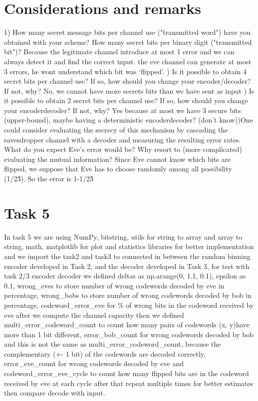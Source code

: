 \documentclass{report}
\begin{document}
\section*{Considerations and remarks}
1) How many secret message bits per channel use ("transmitted word") have you obtained with your
scheme?
How many secret bits per binary digit ("transmitted bit")?  \hfill \break \linebreak
Because the legitimate channel introduce at most 1 error and we can always detect it and find the correct input. the eve channel can generate at most 3 errors, he wont understand which bit was ‘flipped’. \hfill \break  {}) Is it possible to obtain 4 secret bits per channel use?
If so, how should you change your encoder/decoder? If not, why? \hfill \break \linebreak
No, we cannot have more secrets bits than we have sent as input \hfill \break {}) Is it possible to obtain 2 secret bits per channel use?
If so, how should you change your encoder\/decoder? If not, why?  \hfill \break \linebreak
Yes because at most we have 3 secure bits (upper-bound), maybe having a deterministic encoder\/decoder? (don't know)\hfill \break {})One could consider evaluating the secrecy of this mechanism by cascading the eavesdropper channel
with a decoder and measuring the resulting error rates. What do you expect Eve's error would be?
Why resort to (more complicated) evaluating the mutual information? \hfill \break \linebreak
Since Eve cannot know which bits are flipped, we suppose that Eve has to choose randomly among all possibility (1\//2\^3). So the error is 1-1\//2\^3
\section*{Task 5}
In task 5 we are using NumPy, bitstring, utils for string to array and array to string, math, matplotlib for plot and statistics libraries for better implementation and we import the task2 and task3 to connected in between the random binning encoder developed in Task 2, and the decoder
developed in Task 3, for test with task 2/3 encoder decoder we defined deltas as np.arange(0, 1.1, 0.1), epsilon  as 0.1, wrong\_eves to store number of wrong codewords decoded by eve in percentage, wrong\_bobs to store number of wrong codewords decoded by bob in percentage, codeword\_error\_eve for \% of wrong bits in the codeword received by eve after we compute the channel capacity then we defined     multi\_error\_codeword\_count to count how many pairs of codewords (x, y)have more than 1 bit different, error\_bob\_count for wrong codewords decoded by bob and this is not the same as multi\_error\_codeword\_count, because the complementary (+- 1 bit) of the codewords are decoded correctly, error\_eve\_count for wrong codewords decoded by eve and codeword\_error\_eve\_cycle to count how many flipped bits are in the codeword received by eve at each cycle after that repeat multiple times for better estimates then compare decode with input.\hfill \break \linebreak
\end{document}
